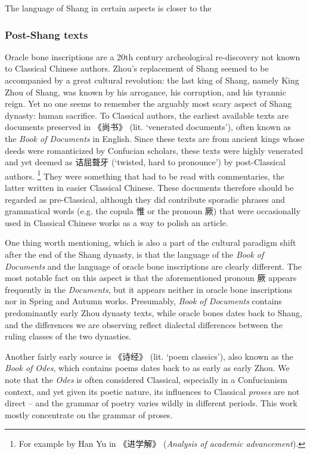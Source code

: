 \documentclass[UTF8, a4paper, oneside, scheme=plain, 12pt]{ctexrep}
\newcommand{\work}[1]{\textit{#1}}
\newcommand{\translate}[1]{`#1'}
\begin{document}
The language of Shang in certain aspects is closer to the  

\subsubsection{Post-Shang texts}

Oracle bone inscriptions are 
a 20th century archeological re-discovery not known to Classical Chinese authors.
Zhou's replacement of Shang seemed to be accompanied by a great cultural revolution:
the last king of Shang, namely King Zhou of Shang, was known by 
his arrogance, his corruption, and his tyrannic reign.
Yet no one seems to remember the arguably most scary aspect of Shang dynasty: human sacrifice.
To Classical authors, the earliest available texts are 
documents preserved in 《尚书》 (lit. \translate{venerated documents}),
often known as the \work{Book of Documents} in English.
Since these texts are from ancient kings 
whose deeds were romanticized by Confucian scholars,
these texts were highly venerated and yet deemed as
诘屈聱牙 (\translate{twisted, hard to pronounce})
by post-Classical authors.%
\footnote{
    For example by Han Yu in 《进学解》 (\work{Analysis of academic advancement}).
}
They were something that had to be read with commentaries,
the latter written in easier Classical Chinese.
These documents therefore should be regarded as pre-Classical,
although they did contribute sporadic phrases
and grammatical words (e.g. the copula 惟 or the pronoun 厥)
that were occasionally used in Classical Chinese works as a way to polish an article.

One thing worth mentioning, which is also a part of the cultural paradigm shift after the end of the Shang dynasty, is that 
the language of the \work{Book of Documents} and the language of oracle bone inscriptions are clearly different.
The most notable fact on this aspect is that
the aforementioned pronoun 厥 appears frequently in the \work{Documents},
but it appears neither in oracle bone inscriptions nor in Spring and Autumn works. 
Presumably, \work{Book of Documents} contains predominantly early Zhou dynasty texts,
while oracle bones dates back to Shang,
and the differences we are observing reflect dialectal differences between the ruling classes of the two dynasties.

Another fairly early source is 《诗经》 (lit. \translate{poem classics}),
also known as the \work{Book of Odes},
which contains poems dates back to as early as early Zhou.
We note that the \work{Odes} is often considered Classical, especially in a Confucianism context,
and yet given its poetic nature, its influences to Classical \emph{proses} are not direct
-- and the grammar of poetry varies wildly in different periods.
This work mostly concentrate on the grammar of proses.
\end{document}
